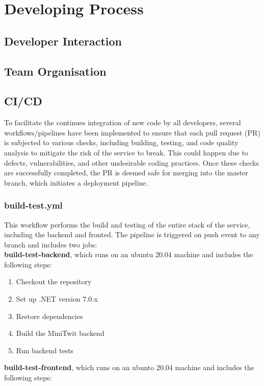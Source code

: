 \chapter{Developing Process}

\section{Developer Interaction}

\section{Team Organisation}

\section{CI/CD}
To facilitate the continues integration of new code by all developers, several workflows/pipelines have been implemented to ensure that each pull request (PR) is subjected to various checks, including building, testing, and code quality analysis to mitigate the risk of the service to break. This could happen due to defects, vulnerabilities, and other undesirable coding practices. Once these checks are successfully completed, the PR is deemed safe for merging into the master branch, which initiates a deployment pipeline.

\subsection{build-test.yml}
This workflow performs the build and testing of the entire stack of the service, including the backend and fronted. The pipeline is triggered on push event to any branch and includes two jobs: \\

\textbf{build-test-backend}, which runs on an ubuntu 20.04 machine and includes the following steps:

\begin{enumerate}
    \item Checkout the repository
    \item Set up .NET version 7.0.x
    \item Restore dependencies
    \item Build the MiniTwit backend
    \item Run backend tests
\end{enumerate}

\textbf{build-test-frontend}, which runs on an ubunto 20.04 machine and includes the following steps:

